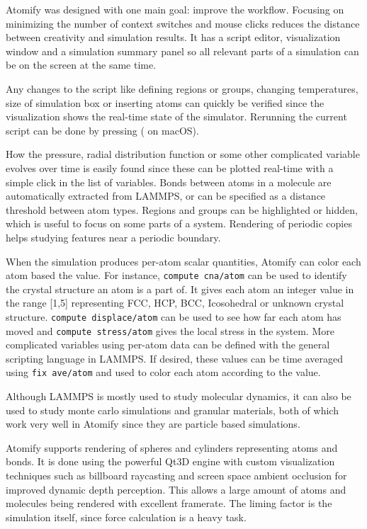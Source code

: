 \documentclass[12pt,a4paper,final]{iopart}
\newcommand{\code}[1]{\colorbox{light-gray}{\color{RawSienna}\texttt{#1}}}
\begin{document}
Atomify was designed with one main goal: improve the workflow.
Focusing on minimizing the number of context switches and mouse clicks reduces
the distance between creativity and simulation results.
It has a script editor, visualization window and a simulation summary panel so all relevant parts
of a simulation can be on the screen at the same time.

Any changes to the script like defining regions or groups,
changing temperatures, size of simulation box or inserting atoms can
quickly be verified since the visualization shows the real-time state of the simulator.
Rerunning the current script can be done by pressing  ( on macOS).

How the pressure, radial distribution function or some other
complicated variable evolves over time is easily found
since these can be plotted real-time with a simple click in the list of variables.
Bonds between atoms in a molecule are automatically extracted from LAMMPS, or can
be specified as a distance threshold between atom types.
Regions and groups can be highlighted or hidden, which is useful to focus on some parts of a system.
Rendering of periodic copies helps studying features near a periodic boundary.

When the simulation produces per-atom scalar quantities, Atomify can color each atom based the value.
For instance, \code{compute cna/atom}\cite{faken1994systematic, tsuzuki2007structural} can be used to identify the crystal structure an atom is a part of.
It gives each atom an integer value in the range [1,5] representing FCC, HCP, BCC, Icosohedral or unknown crystal structure.
\code{compute displace/atom} can be used to see how far each atom has moved and \code{compute stress/atom} gives the local stress in the system.
More complicated variables using per-atom data can be defined with the general scripting language in LAMMPS.
If desired, these values can be time averaged using \code{fix ave/atom} and used to color each atom according to the value.

Although LAMMPS is mostly used to study molecular dynamics, it can also be used to
study monte carlo simulations\cite{frenkel2001understanding} and granular
materials\cite{brilliantov1996model, silbert2001granular, zhang2005jamming},
both of which work very well in Atomify since they are particle based simulations.

Atomify supports rendering of spheres and cylinders representing atoms and bonds.
It is done using the powerful Qt3D engine with custom visualization techniques such as
billboard raycasting\cite{gumhold2003splatting, sigg2006gpu, tarini2006ambient} and screen space ambient occlusion\cite{bavoil2008screen}
for improved dynamic depth perception. This allows a large amount of atoms and molecules being rendered with excellent framerate.
The liming factor is the simulation itself, since force calculation is a heavy task.
\end{document}
